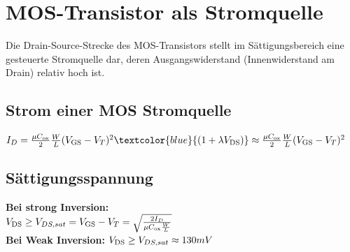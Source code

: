 \section{MOS-Transistor als Stromquelle}
Die Drain-Source-Strecke des MOS-Transistors stellt im Sättigungsbereich eine gesteuerte Stromquelle dar, deren Ausgangswiderstand (Innenwiderstand am Drain) relativ hoch ist.\\
\begin{minipage}{0.5\linewidth}
\subsection{Strom einer MOS Stromquelle}
$I_D = \frac{\mu C_{\rm ox}}{2}\frac{W}{L}(V_{\rm GS}-V_T)^2\textcolor{blue}{(1+\lambda V_{\rm DS})}\approx\frac{\mu C_{\rm ox}}{2}\frac{W}{L}(V_{\rm GS}-V_T)^2$
\end{minipage}%
\begin{minipage}{0.5\linewidth}
\subsection{Sättigungsspannung}
\textbf{Bei strong Inversion:}\\ $V_{\rm DS} \geq V_{DS,sat} = V_{\rm GS} - V_T = \sqrt{\frac{2 I_D}{\mu C_{\rm ox}\frac{W}{L}}}$\vspace{5pt}\\
\textbf{Bei Weak Inversion:} $V_{\rm DS} \geq V_{DS,sat}\approx 130 mV$
\end{minipage}\vspace{5pt}\\
